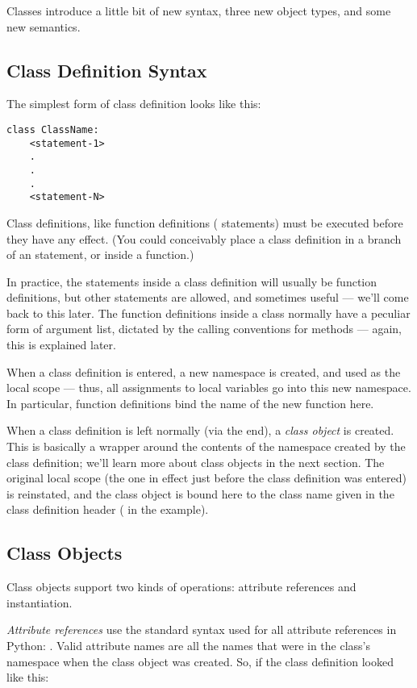 \documentclass{manual}
\begin{document}
Classes introduce a little bit of new syntax, three new object types,
and some new semantics.


\subsection{Class Definition Syntax \label{classDefinition}}

The simplest form of class definition looks like this:

\begin{verbatim}
class ClassName:
    <statement-1>
    .
    .
    .
    <statement-N>
\end{verbatim}

Class definitions, like function definitions
( statements) must be executed before they have any
effect.  (You could conceivably place a class definition in a branch
of an  statement, or inside a function.)

In practice, the statements inside a class definition will usually be
function definitions, but other statements are allowed, and sometimes
useful --- we'll come back to this later.  The function definitions
inside a class normally have a peculiar form of argument list,
dictated by the calling conventions for methods --- again, this is
explained later.

When a class definition is entered, a new namespace is created, and
used as the local scope --- thus, all assignments to local variables
go into this new namespace.  In particular, function definitions bind
the name of the new function here.

When a class definition is left normally (via the end), a \emph{class
object} is created.  This is basically a wrapper around the contents
of the namespace created by the class definition; we'll learn more
about class objects in the next section.  The original local scope
(the one in effect just before the class definition was entered) is
reinstated, and the class object is bound here to the class name given
in the class definition header ( in the example).


\subsection{Class Objects \label{classObjects}}

Class objects support two kinds of operations: attribute references
and instantiation.

\emph{Attribute references} use the standard syntax used for all
attribute references in Python: .  Valid attribute
names are all the names that were in the class's namespace when the
class object was created.  So, if the class definition looked like
this:
\end{document}
